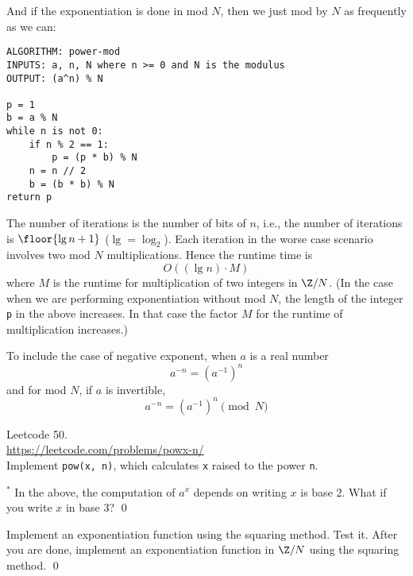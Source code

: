 And if the exponentiation is done in mod $N$, then we just
mod by $N$ as frequently as we can:
\begin{Verbatim}[frame=single,fontsize=\footnotesize]
ALGORITHM: power-mod
INPUTS: a, n, N where n >= 0 and N is the modulus
OUTPUT: (a^n) % N

p = 1
b = a % N
while n is not 0:
    if n % 2 == 1:
        p = (p * b) % N
    n = n // 2 
    b = (b * b) % N
return p    
\end{Verbatim}

The number of iterations is the number of bits of $n$, i.e.,
the number of iterations is $\floor{\lg n + 1}$ ($\lg = \log_2$).
Each iteration in the worse case scenario involves
two mod $N$ multiplications.
Hence the runtime time is
\[
O((\lg n) \cdot M)
\]
where $M$ is the runtime for multiplication of two integers in $\Z/N$.
(In the case when we are performing exponentiation without mod $N$,
the length of the integer \verb!p! in the above increases.
In that case the factor $M$ for the runtime of multiplication increases.)


To include the case of negative exponent, when $a$ is a real number
\[
a^{-n} = (a^{-1})^n
\]
and for mod $N$, if $a$ is invertible,
\[
a^{-n} = (a^{-1})^n \pmod{N}
\]

\begin{ex}
  Leetcode 50.\\
  \url{https://leetcode.com/problems/powx-n/}\\
  Implement \verb!pow(x, n)!,
  which calculates \verb!x! raised to the power
  \verb!n!.
\end{ex}


\begin{ex}$^*$
  In the above, the computation of $a^x$ depends on writing $x$ is base 2.
  What if you write $x$ in base 3?
  \qed
\end{ex}


\begin{ex}
  Implement an exponentiation function using the squaring method.
  Test it.
  After you are done, implement an exponentiation function in $\Z/N$
  using the squaring method.
  \qed
\end{ex}

